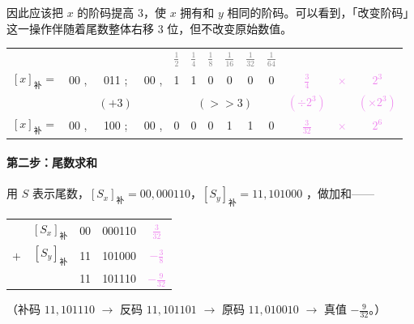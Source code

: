\documentclass[UTF8]{ctexart}
\newcommand\littleword[1]{\textcolor{gray}{\footnotesize #1}}
\begin{document}
因此应该把 $x$ 的阶码提高 3，使 $x$ 拥有和 $y$ 相同的阶码。可以看到，「改变阶码」这一操作伴随着尾数整体右移 3 位，但不改变原始数值。

\begin{table}[htb]
  \centering
  \begin{tabular}{cccccccccc|ccc}
  & & & & \littleword{$\frac12$} & \littleword{$\frac14$} & \littleword{$\frac18$} & \littleword{$\frac1{16}$} & \littleword{$\frac1{32}$} & \littleword{$\frac1{64}$} & & &\\
  $[x]_{\text{补}}=$ & 00 ,& 011 ;& 00 ,& 1&1&0&0&0&0 & \textcolor{violet}{$\frac34$} & \textcolor{violet}{$\times$} & \textcolor{violet}{$2^3$} \\
  & & $(+3)$ & & \multicolumn{6}{c}{$(>>3)$} & \textcolor{violet}{$(\div 2^3)$} & & \textcolor{violet}{$(\times 2^3)$}\\
  $[x]_{\text{补}}=$ & 00 ,& 100 ;& 00 ,& 0&0&0&1&1&0 & \textcolor{violet}{$\frac{3}{32}$} & \textcolor{violet}{$\times$} & \textcolor{violet}{$2^6$} \\
  \end{tabular}
\end{table}


\paragraph{第二步：尾数求和} 用 $S$ 表示尾数，$[S_x]_{\text{补}} = 00,000110$，$[S_y]_{\text{补}} = 11,101000$ ，做加和——
\begin{table}[htb]
  \centering
  \begin{tabular}{lr@{\quad}c@{\ ,\ }c@{\qquad}c}
      & $[S_x]_{\text{补}}$ & 00 & 000110 & \textcolor{violet}{$\frac3{32}$}\\
  $+$ & $[S_y]_{\text{补}}$ & 11 & 101000 & \textcolor{violet}{$-\frac{3}{8}$}\\
  \hline
      & & 11 & 101110 & \textcolor{violet}{$-\frac{9}{32}$}\\
  \end{tabular}
\end{table}

（补码 $11,101110$ $\to$ 反码 $11,101101$ $\to$ 原码 $11,010010$ $\to$ 真值 $-\frac{9}{32}$。）
\end{document}
